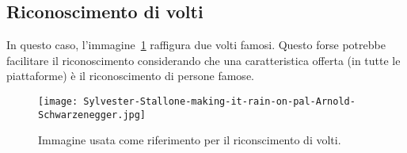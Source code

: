 \subsection{Riconoscimento di volti}\label{subsec:riconscimento-volti}
In questo caso, l'immagine~\ref{fig:stallone} raffigura due volti famosi. Questo forse potrebbe facilitare il riconoscimento
considerando che una caratteristica offerta (in tutte le piattaforme) è il riconoscimento di persone famose.
%
\begin{figure}[!h]
\begin{center}
	\texttt{[image: Sylvester-Stallone-making-it-rain-on-pal-Arnold-Schwarzenegger.jpg]}
{\scriptsize \caption{Immagine usata come riferimento per il riconscimento di volti.}
\label{fig:stallone}}
\end{center}
\end{figure}
%
